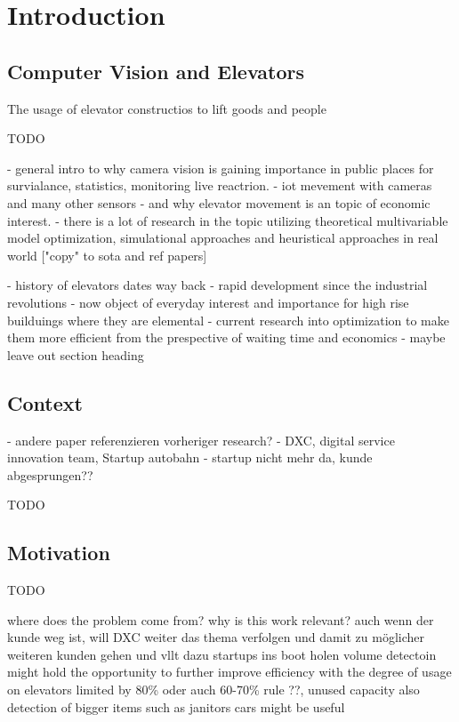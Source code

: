 \chapter{Introduction}
\label{chap:intro}

\section{Computer Vision and Elevators}

The usage of elevator constructios to lift goods and people 

TODO


- general intro to why camera vision is gaining importance in public places for survialance, statistics, monitoring live reactrion. 
- iot mevement with cameras and many other sensors
- and why elevator movement is an topic of economic interest.
- there is a lot of research in the topic utilizing theoretical multivariable model optimization, simulational approaches and heuristical approaches in real world ["copy" to sota and ref papers]

- history of elevators dates way back
- rapid development since the industrial revolutions
- now object of everyday interest and importance for high rise builduings where they are elemental
- current research into optimization to make them more efficient from the prespective of waiting time and economics
- maybe leave out section heading





\section{Context}

- andere paper referenzieren vorheriger research?
- DXC, digital service innovation team, Startup autobahn
- startup nicht mehr da, kunde abgesprungen??


TODO

\section{Motivation}


TODO


where does the problem come from?
why is this work relevant?
auch wenn der kunde weg ist, will DXC weiter das thema verfolgen und damit zu möglicher weiteren kunden gehen und vllt dazu startups ins boot holen
volume detectoin might hold the opportunity to further improve efficiency with the degree of usage on elevators
limited by 80\% oder auch 60-70\% rule ??, unused capacity
also detection of bigger items such as janitors cars might be useful


